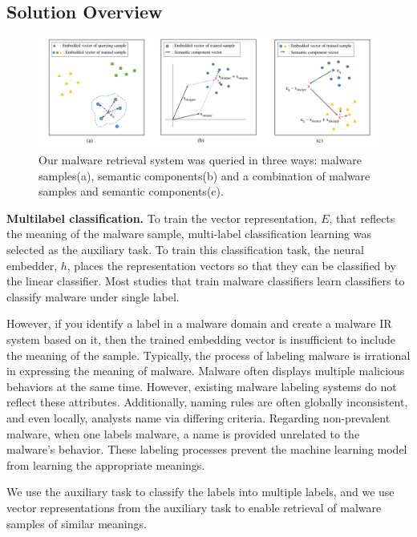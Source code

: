 \subsection{Solution Overview}
\begin{figure}[!htb] %
  \includegraphics[width=\textwidth]{../../figures/qualitative_all_fix2.pdf}
  \caption{Our malware retrieval system was queried in three ways: malware samples(a), semantic components(b) and a combination of malware samples and semantic components(c).}
  \label{fig:qualitative_all}
\end{figure}

\textbf{Multilabel classification. }
To train the vector representation, $E$, that reflects the meaning of the malware sample, multi-label classification learning was selected as the auxiliary task. To train this classification task, the neural embedder, $h$, places the representation vectors so that they can be classified by the linear classifier. Most studies that train malware classifiers learn classifiers to classify malware under single label.

However, if you identify a label in a malware domain and create a malware IR system based on it, then the trained embedding vector is insufficient to include the meaning of the sample. Typically, the process of labeling malware is irrational in expressing the meaning of malware. Malware often displays multiple malicious behaviors at the same time. However, existing malware labeling systems do not reflect these attributes. Additionally, naming rules are often globally inconsistent, and even locally, analysts name via differing criteria. Regarding non-prevalent malware, when one labels malware, a name is provided unrelated to the malware’s behavior. These labeling processes prevent the machine learning model from learning the appropriate meanings. 

We use the auxiliary task to classify the labels into multiple labels, and we use vector representations from the auxiliary task to enable retrieval of malware samples of similar meanings.

